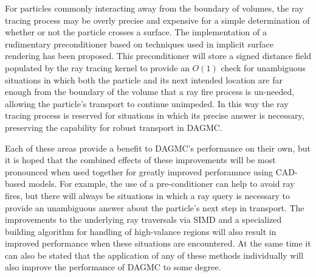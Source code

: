 \documentclass[12pt, a4paper]{article}
\begin{document}
For particles commonly interacting away from the boundary of volumes, the ray tracing process may be overly precise and expensive for a simple determination of whether or not the particle crosses a surface. The implementation of a rudimentary preconditioner based on techniques used in implicit surface rendering has been proposed. This preconditioner will store a signed distance field populated by the ray tracing kernel to provide an $O(1)$ check for unambiguous situations in which both the particle and its next intended location are far enough from the boundary of the volume that a ray fire process is un-needed, allowing the particle's transport to continue unimpeded. In this way the ray tracing process is reserved for situations in which its precise answer is necessary, preserving the capability for robust transport in DAGMC.

Each of these areas provide a benefit to DAGMC's performance on their own, but it is hoped that the combined effects of these improvements will be most pronounced when used together for greatly improved perforamnce using CAD-based models. For example, the use of a pre-conditioner can help to avoid ray fires, but there will always be situations in which a ray query is necessary to provide an unambiguous answer about the particle's next step in transport. The improvements to the underlying ray traversals via SIMD and a specialized building algorithm for handling of high-valance regions will also result in improved performance when these situations are encountered. At the same time it can also be stated that the application of any of these methods individually will also improve the performance of DAGMC to some degree.


\end{document}
